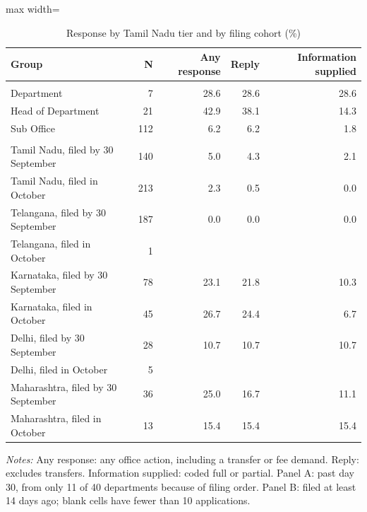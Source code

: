 \begin{table}[!htbp]
\centering
\caption{Response by Tamil Nadu tier and by filing cohort (\%)}
\label{tab:tab_cuts}
\small
\begin{adjustbox}{max width=\textwidth}
\begin{threeparttable}
\begin{tabular}{lrrrr}
\toprule
Group & N & Any response & Reply & Information supplied \\
\midrule
\addlinespace\multicolumn{5}{l}{\textit{Panel A. Tamil Nadu by tier, by day 30}} \\
Department & 7 & 28.6 & 28.6 & 28.6 \\
Head of Department & 21 & 42.9 & 38.1 & 14.3 \\
Sub Office & 112 & 6.2 & 6.2 & 1.8 \\
\addlinespace\multicolumn{5}{l}{\textit{Panel B. By filing cohort, by day 14}} \\
Tamil Nadu, filed by 30 September & 140 & 5.0 & 4.3 & 2.1 \\
Tamil Nadu, filed in October & 213 & 2.3 & 0.5 & 0.0 \\
Telangana, filed by 30 September & 187 & 0.0 & 0.0 & 0.0 \\
Telangana, filed in October & 1 &  &  &  \\
Karnataka, filed by 30 September & 78 & 23.1 & 21.8 & 10.3 \\
Karnataka, filed in October & 45 & 26.7 & 24.4 & 6.7 \\
Delhi, filed by 30 September & 28 & 10.7 & 10.7 & 10.7 \\
Delhi, filed in October & 5 &  &  &  \\
Maharashtra, filed by 30 September & 36 & 25.0 & 16.7 & 11.1 \\
Maharashtra, filed in October & 13 & 15.4 & 15.4 & 15.4 \\
\bottomrule
\end{tabular}
\begin{tablenotes}[flushleft]\footnotesize
\item \textit{Notes:} Any response: any office action, including a transfer or fee demand. Reply: excludes transfers. Information supplied: coded full or partial. Panel A: past day 30, from only 11 of 40 departments because of filing order. Panel B: filed at least 14 days ago; blank cells have fewer than 10 applications.
\end{tablenotes}
\end{threeparttable}
\end{adjustbox}
\end{table}
